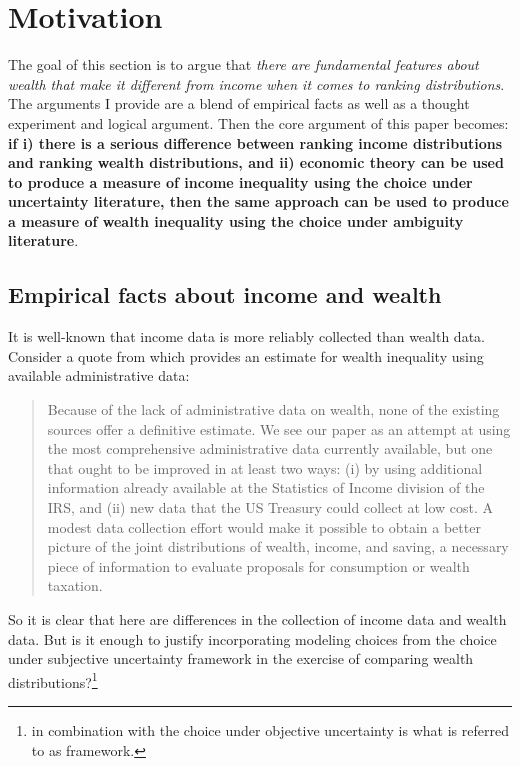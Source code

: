 \documentclass[Chp3.tex]{subfiles}
\begin{document}
\section{Motivation}
\label{sec:Motivation}


\par The goal of this section is to argue that \textit{there are fundamental features about wealth that make it different from income when it comes to ranking distributions}. The arguments I provide are a blend of empirical facts as well as a thought experiment and logical argument. Then the core argument of this paper becomes: \textbf{if i) there is a serious difference between ranking income distributions and ranking wealth distributions, and  ii) economic theory can be used to produce a measure of income inequality using the choice under uncertainty literature, then the same approach can be used to produce a measure of wealth inequality using the choice under ambiguity literature}. 

\subsection{Empirical facts about income and wealth}

\par It is well-known that income data is more reliably collected than wealth data. Consider a quote from \cite{sz16} which provides an estimate for wealth inequality using available administrative data:

\begin{quote}

Because of the lack of administrative data on wealth, none of the existing sources offer a definitive estimate. We see our paper as an attempt at using the most comprehensive administrative data currently available, but one that ought to be improved in at least two ways: (i) by using additional information already available at the Statistics of Income division of the IRS, and (ii) new data that the US Treasury could collect at low cost. A modest data collection effort would make it possible to obtain a better picture of the joint distributions of wealth, income, and saving, a necessary piece of information to evaluate proposals for consumption or wealth taxation.

\end{quote}

\par So it is clear that here are differences in the collection of income data and wealth data. But is it enough to justify incorporating modeling choices from the choice under subjective uncertainty framework in the exercise of comparing wealth distributions?\footnote{in combination with the choice under objective uncertainty is what is referred to as  framework.} 
\end{document}
